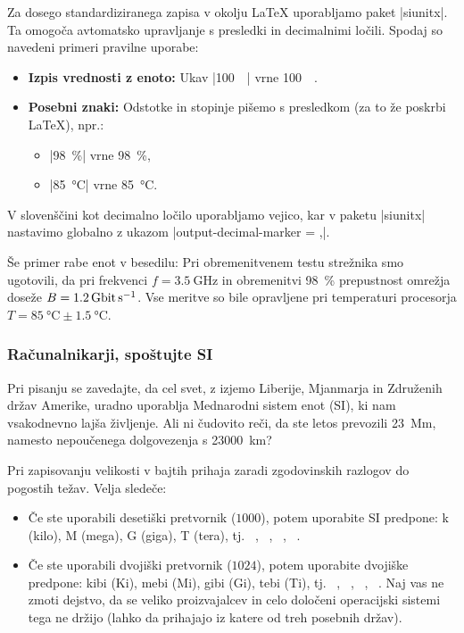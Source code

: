 \documentclass[9pt]{style/friteza}
\begin{document}
Za dosego standardiziranega zapisa v okolju \LaTeX{} uporabljamo paket \ltx|siunitx|. Ta omogoča avtomatsko upravljanje s presledki in decimalnimi ločili. Spodaj so navedeni primeri pravilne uporabe:

\begin{itemize}
    \item \textbf{Izpis vrednosti z enoto:} Ukav \ltx|\qty{100}{\giga\byte}| vrne \qty{100}{\giga\byte}.
    \item \textbf{Posebni znaki:} Odstotke in stopinje pišemo s presledkom (za to že poskrbi \LaTeX), npr.:
    \begin{itemize}
         \item\ltx|\qty{98}{\percent}| vrne \qty{98}{\percent},
         \item\ltx|\qty{85}{\degreeCelsius}| vrne \qty{85}{\degreeCelsius}.
     \end{itemize}
\end{itemize}

V slovenščini kot decimalno ločilo uporabljamo vejico, kar v paketu \ltx|siunitx| nastavimo globalno z ukazom \ltx|output-decimal-marker = {,}|.

Še primer rabe enot v besedilu: Pri obremenitvenem testu strežnika smo ugotovili, da pri frekvenci $f = \qty{3,5}{\giga\hertz}$ in obremenitvi \qty{98}{\percent} prepustnost omrežja doseže $B = \qty{1,2}{\giga\bit\per\second}$. Vse meritve so bile opravljene pri temperaturi procesorja $T = \qty{85}{\degreeCelsius} \pm \qty{1,5}{\degreeCelsius}$.

\subsubsection{Računalnikarji, spoštujte SI}
Pri pisanju se zavedajte, da cel svet, z izjemo Liberije, Mjanmarja in Združenih držav Amerike, uradno uporablja Mednarodni sistem enot (SI), ki nam vsakodnevno lajša življenje. Ali ni čudovito reči, da ste letos prevozili \qty{23}{\mega\meter}, namesto nepoučenega dolgovezenja s \qty{23000}{\kilo\meter}?

Pri zapisovanju velikosti v bajtih prihaja zaradi zgodovinskih razlogov do pogostih težav. Velja sledeče:
\begin{itemize}
\item Če ste uporabili desetiški pretvornik ($1000$), potem uporabite SI predpone: k (kilo), M (mega), G (giga), T (tera), tj. \unit{\kilo\byte}, \unit{\mega\byte}, \unit{\giga\byte}, \unit{\tera\byte}.
\item Če ste uporabili dvojiški pretvornik ($1024$), potem uporabite dvojiške predpone: 
kibi (\unit{Ki}), mebi (\unit{Mi}), gibi (\unit{Gi}), tebi (\unit{Ti}), 
tj. \unit{\kibi\byte}, \unit{\mebi\byte}, \unit{\gibi\byte}, \unit{\tebi\byte}. 
Naj vas ne zmoti dejstvo, da se veliko proizvajalcev in celo določeni operacijski 
sistemi tega ne držijo (lahko da prihajajo iz katere od treh posebnih držav).
\end{itemize}
\end{document}
